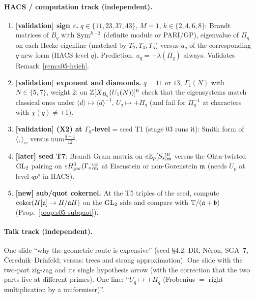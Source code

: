 \paragraph{HACS / computation track (independent).}
\begin{enumerate}[label=\textbf{T05-\arabic*}]
\item\label{tc:s05-sign} \textbf{[validation] sign $\varepsilon$.} $q\in\{11,23,37,43\}$, $M=1$, $k\in\{2,4,6,8\}$: Brandt
  matrices of $B_q$ with $\mathrm{Sym}^{k-2}$ (definite module or PARI/GP), eigenvalue of $\Pi_q$ on each Hecke eigenline (matched by
  $T_2,T_3,T_5$) versus $a_q$ of the corresponding $q$-new form (HACS level $q$). Prediction: $a_q=+\lambda(\Pi_q)$ always.
  Validates Remark~\ref{rem:s05-hsieh}. 
\item\label{tc:s05-exp} \textbf{[validation] exponent and diamonds.} $q=11$ or $13$, $\Gamma_1(N)$ with $N\in\{5,7\}$, weight $2$:
  on $\mathbb{Z}[X_{B_q}(U_1(N))]^0$ check that the eigensystems match classical ones under $\langle d\rangle\mapsto\langle d\rangle^{-1}$,
  $U_q\mapsto+\Pi_q$ (and fail for $\Pi_q^{-1}$ at characters with $\chi(q)\ne\pm1$).
\item \textbf{[validation] (X2) at $\Gamma_0$-level} = seed T1 (stage 03 runs it): Smith form of $\langle,\rangle_w$ versus
  $\mathrm{num}\frac{q-1}{12}$.
\item \textbf{[later] seed T7}: Brandt Gram matrix on $e\mathbb{Z}_p[S_s]^0_{\mathfrak{m}}$ versus the Ohta-twisted $\mathrm{GL}_2$ pairing on
  $eH^1_{\rm par}(\Gamma_s)^\pm_{\mathfrak{m}}$ at Eisenstein or non-Gorenstein $\mathfrak{m}$ (needs $U_p$ at level $qp^s$ in HACS).
\item \textbf{[new] sub/quot cokernel.} At the T5 triples of the seed, compute $\operatorname{coker}(H[\mathfrak{a}]\to H/\mathfrak{a} H)$ on the $\mathrm{GL}_2$ side and
  compare with $\mathbb{T}/(\mathfrak{a}+\mathfrak{b})$ (Prop.~\ref{prop:s05-subquot}).
\end{enumerate}

\paragraph{Talk track (independent).}
One slide ``why the geometric route is expensive'' (seed \S4.2: DR, Néron, SGA~7, Čerednik--Drinfeld; versus: trees and
strong approximation). One slide with the two-part zig-zag and its single hypothesis arrow (with the correction that the two
parts live at different primes). One line: ``$U_q\mapsto+\Pi_q$ (Frobenius $=$ right multiplication by a uniformiser)''.

